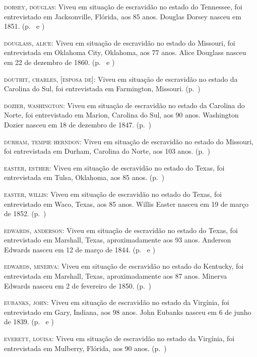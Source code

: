 \begin{Parskip}
\textsc{dorsey, douglas:} Viveu em situação de escravidão no estado do Tennessee, foi
entrevistado em Jacksonville, Flórida, aos 85 anos. Douglas Dorsey
nasceu em 1851. (p.~\pageref{ref71} e \pageref{ref72})

\textsc{douglass, alice:} Viveu em situação de escravidão no estado do Missouri, foi
entrevistada em Oklahoma City, Oklahoma, aos 77 anos. Alice Douglass
nasceu em 22 de dezembro de 1860. (p.~\pageref{ref73} e \pageref{ref74})

\textsc{douthit, charles, {[}esposa de{]}:} Viveu em situação de escravidão no estado da
Carolina do Sul, foi entrevistada em Farmington, Missouri. (p.~\pageref{ref75})

\textsc{dozier, washington:} Viveu em situação de escravidão no estado da Carolina do Norte, foi
entrevistado em Marion, Carolina do Sul, aos 90 anos. Washington Dozier
nasceu em 18 de dezembro de 1847. (p.~\pageref{ref76})

\textsc{durham, tempie herndon:} Viveu em situação de escravidão no estado do Missouri, foi
entrevistada em Durham, Carolina do Norte, aos 103 anos. (p.~\pageref{ref77})

\textsc{easter, esther:} Viveu em situação de escravidão no estado do Texas, foi entrevistada em
Tulsa, Oklahoma, aos 85 anos. (p.~\pageref{ref78})

\textsc{easter, willis:} Viveu em situação de escravidão no estado do Texas, foi entrevistado em
Waco, Texas, aos 85 anos. Willis Easter nasceu em 19 de março de 1852. (p.~\pageref{ref79})

\textsc{edwards, anderson:} Viveu em situação de escravidão no estado do Texas, foi entrevistado
em Marshall, Texas, aproximadamente aos 93 anos. Anderson Edwards nasceu
em 12 de março de 1844. (p.~\pageref{ref80} e \pageref{ref81})

\textsc{edwards, minerva:} Viveu em situação de escravidão no estado do Kentucky, foi
entrevistada em Marshall, Texas, aproximadamente aos 87 anos. Minerva
Edwards nasceu em 2 de fevereiro de 1850. (p.~\pageref{ref82})

\textsc{eubanks, john:} Viveu em situação de escravidão no estado da Virgínia, foi entrevistado
em Gary, Indiana, aos 98 anos. John Eubanks nasceu em 6 de junho de
1839. (p.~\pageref{ref83} e \pageref{ref84})

\textsc{everett, louisa:} Viveu em situação de escravidão no estado da Virgínia, foi
entrevistada em Mulberry, Flórida, aos 90 anos. (p.~\pageref{ref85})


\end{Parskip}
